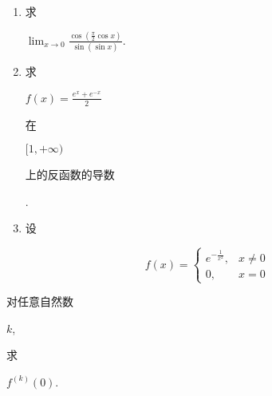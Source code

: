 \documentclass[10pt]{article}
\begin{document}
\begin{enumerate}
  \item \begin{CJK}{UTF8}{mj}求\end{CJK} $\lim _{x \rightarrow 0} \frac{\cos \left(\frac{\pi}{2} \cos x\right)}{\sin (\sin x)}$.

  \item \begin{CJK}{UTF8}{mj}求\end{CJK} $f(x)=\frac{e^{x}+e^{-x}}{2}$ \begin{CJK}{UTF8}{mj}在\end{CJK} $[1,+\infty)$ \begin{CJK}{UTF8}{mj}上的反函数的导数\end{CJK}.

  \item \begin{CJK}{UTF8}{mj}设\end{CJK}

\end{enumerate}
$$
f(x)= \begin{cases}e^{-\frac{1}{x^{2}}}, & x \neq 0 \\ 0, & x=0\end{cases}
$$
\begin{CJK}{UTF8}{mj}对任意自然数\end{CJK} $k$, \begin{CJK}{UTF8}{mj}求\end{CJK} $f^{(k)}(0)$.
\end{document}
